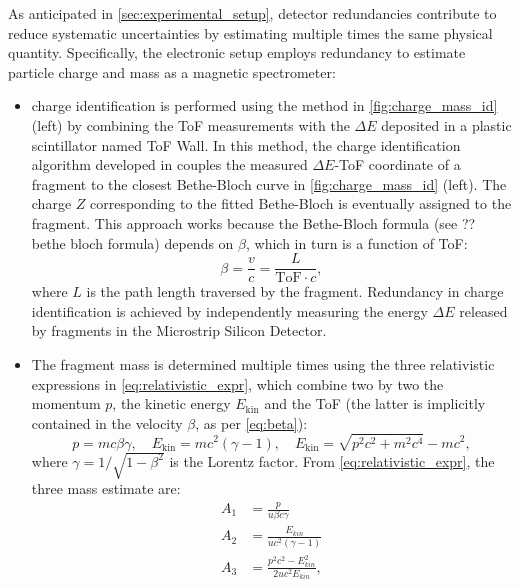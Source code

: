 As anticipated in \autoref{sec:experimental_setup}, detector redundancies contribute to reduce systematic uncertainties by estimating multiple times the same physical quantity. Specifically, the electronic setup employs redundancy to estimate particle charge and mass as a magnetic spectrometer:
\begin{itemize}
	\item charge identification is performed using the method in \autoref{fig:charge_mass_id} (left) by combining the ToF measurements with the $\Delta E$ deposited in a plastic scintillator named ToF Wall. In this method, the charge identification algorithm developed in \cite{10.3389/fphy.2022.979229} couples the measured $\Delta E$-ToF coordinate of a fragment to the closest Bethe-Bloch curve in \autoref{fig:charge_mass_id} (left). The charge $Z$ corresponding to the fitted Bethe-Bloch is eventually assigned to the fragment. This approach works because the Bethe-Bloch formula (see ?? bethe bloch formula) depends on $\beta$, which in turn is a function of ToF:
	\begin{equation}
		\beta=\frac{v}{c}=\frac{L}{\text{ToF}\cdot c},
		\label{eq:beta}
	\end{equation}
	where $L$ is the path length traversed by the fragment. Redundancy in charge identification is achieved by independently measuring the energy $\Delta E$ released by fragments in the Microstrip Silicon Detector.
	\item The fragment mass is determined multiple times using the three relativistic expressions in \autoref{eq:relativistic_expr}, which combine two by two the momentum $p$, the kinetic energy $E_\text{kin}$ and the ToF (the latter is implicitly contained in the velocity $\beta$, as per \autoref{eq:beta}):
	\begin{equation}
		p=mc\beta\gamma,\quad
		E_\text{kin}=mc^2\left(\gamma-1\right),\quad
		E_\text{kin}=\sqrt{p^2c^2+m^2c^4}-mc^2,
		\label{eq:relativistic_expr}
	\end{equation}
	where $\gamma=1/\sqrt{1-\beta^2}$ is the Lorentz factor. From \autoref{eq:relativistic_expr}, the three mass estimate are:
	\begin{subequations}
		\begin{align}
			\label{eq:a1}
			A_1&=\frac{p}{u\beta c\gamma}\\
			\label{eq:a2}
			A_2&=\frac{E_{kin}}{uc^2\left(\gamma-1\right)}\\
			\label{eq:a3}
			A_3&=\frac{p^2c^2-E_{kin}^2}{2uc^2E_{kin}},
		\end{align}

\end{subequations}
\end{itemize}

